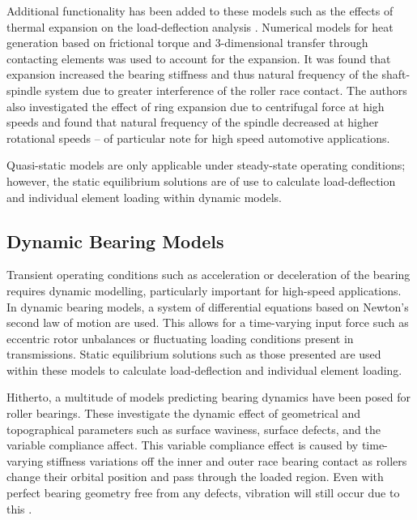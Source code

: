 Additional functionality has been added to these models such as the effects of thermal expansion on the load-deflection analysis \cite{Jorgensen1997}. Numerical models for heat generation based on frictional torque and 3-dimensional transfer through contacting elements was used to account for the expansion. It was found that expansion increased the bearing stiffness and thus natural frequency of the shaft-spindle system due to greater interference of the roller race contact. The authors also investigated the effect of ring expansion due to centrifugal force at high speeds \cite{Jorgensen1998} and found that natural frequency of the spindle decreased at higher rotational speeds – of particular note for high speed automotive applications.

Quasi-static models are only applicable under steady-state operating conditions; however, the static equilibrium solutions \cite{Andreason1973} \cite{Liu1976} \cite{DeMul1989_1} are of use to calculate load-deflection and individual element loading within dynamic models.

\subsection{Dynamic Bearing Models}
Transient operating conditions such as acceleration or deceleration of the bearing requires dynamic modelling, particularly important for high-speed applications. In dynamic bearing models, a system of differential equations based on Newton’s second law of motion are used. This allows for a time-varying input force such as eccentric rotor unbalances or fluctuating loading conditions present in transmissions. Static equilibrium solutions such as those presented are used within these models to calculate load-deflection and individual element loading. 

Hitherto, a multitude of models predicting bearing dynamics have been posed for roller bearings. These investigate the dynamic effect of geometrical and topographical parameters such as surface waviness, surface defects, and the variable compliance affect. This variable compliance effect is caused by time-varying stiffness variations off the inner and outer race bearing contact as rollers change their orbital position and pass through the loaded region. Even with perfect bearing geometry free from any defects, vibration will still occur due to this \cite{Sopanen2003_1}.
  
